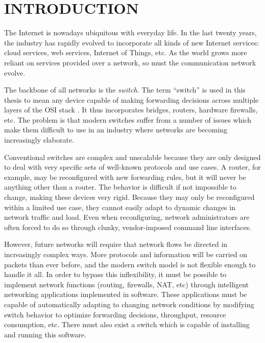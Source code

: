 \chapter{INTRODUCTION} \label{ch:intro}

%
%


The Internet is nowadays ubiquitous with everyday life. In the last twenty
years,
the industry has rapidly evolved to incorporate all kinds of new Internet
services:
cloud services, web services, Internet of Things, etc. As the world grows
more reliant on services provided over a network, so must the communication network evolve.

The backbone of all networks is the \emph{switch}. The term ``switch'' is used in this thesis to mean any device capable of making forwarding decisions across multiple layers of the OSI stack \cite{osi_model}. It thus incorporates bridges, routers, hardware firewalls, etc.
The problem is that modern switches suffer from a number of issues which make them difficult to use in an industry where networks are becoming increasingly elaborate.

Conventional switches are complex and unscalable because they are only designed to deal with very specific sets of well-known protocols and use cases. A router, for example, may be reconfigured with new forwarding rules, but it will never be anything other than a router. The behavior is difficult if not impossible to change, making these devices very rigid.
Because they may only be reconfigured within a limited use case, they cannot easily adapt to dynamic changes in network traffic and load.
Even when reconfiguring, network administrators are often forced to do so through clunky, vendor-imposed command line interfaces.

However, future networks will require that network flows be directed in increasingly complex ways. More protocols and information will be carried on packets than ever before, and the modern switch model is not flexible enough to handle it all.
In order to bypass this inflexibility, it must be possible to implement network functions (routing, firewalls, NAT, etc) through intelligent networking applications implemented in software.
These applications must be capable of automatically adapting to changing network conditions by modifying switch behavior to optimize forwarding decisions, throughput, resource consumption, etc.
There must also exist a switch which is capable of installing and running this software.

